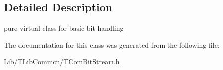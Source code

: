 \subsection{Detailed Description}
pure virtual class for basic bit handling 

The documentation for this class was generated from the following file\+:\begin{DoxyCompactItemize}
\item 
Lib/\+T\+Lib\+Common/\hyperlink{_t_com_bit_stream_8h}{T\+Com\+Bit\+Stream.\+h}\end{DoxyCompactItemize}
